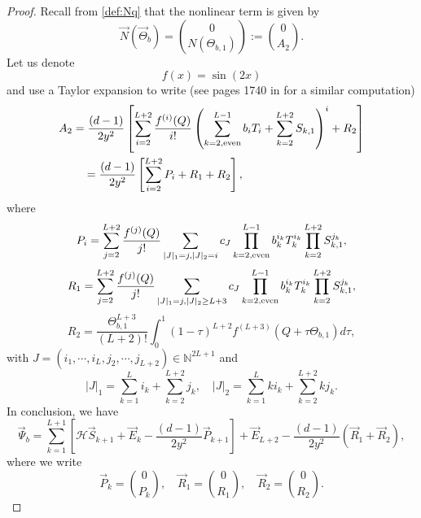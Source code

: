 \documentclass[11pt]{aims}
\theoremstyle{definition}
\numberwithin{equation}{section}
\begin{document}
\begin{proof}
Recall from \eqref{def:Nq} that the nonlinear term is given by
$$\vec N(\vec \Theta_b)= \binom{0}{N(\Theta_{b,1})}:= \binom{0}{A_2}.$$ 
Let us denote 
$$f(x) = \sin(2x)$$
and use a Taylor expansion to write (see pages 1740 in \cite{RSapde2014} for a similar computation)
\begin{align*}
A_2 &= \frac{(d-1)}{2y^2}\left[\sum_{i = 2}^{L+2}\frac{f^{(i)}(Q)}{i!}\left(\sum_{k = 2, \textup{even}}^{L-1}b_iT_i + \sum_{k = 2}^{L+2}S_{k,1} \right)^i + R_2\right]\\
&\quad = \frac{(d-1)}{2y^2}\left[\sum_{i = 2}^{L+2}P_i + R_1 + R_2\right],
\end{align*}
where 
\begin{equation}\label{def:Pj}
P_i = \sum_{j = 2}^{L+2}\frac{f^{(j)}(Q)}{j!}\sum_{|J|_1 = j, |J|_2 = i}c_J \prod_{k = 2, \textup{even}}^{L-1} b_k^{i_k}T_{k}^{i_k}\prod_{k=2}^{L+2}S_{k,1}^{j_k},
\end{equation}
\begin{equation}\label{def:R_1}
R_1 = \sum_{j = 2}^{L+2}\frac{f^{(j)}(Q)}{j!}\sum_{|J|_1 = j, |J|_2 \geq L+3}c_J \prod_{k = 2, \textup{even}}^{L-1}b_k^{i_k}T_{k}^{i_k}\prod_{k=2}^{L+2}S_{k,1}^{j_k},
\end{equation}
\begin{equation}\label{def:R2}
R_2 = \frac{\Theta_{b,1}^{L+3}}{(L+2)!}\int_0^1(1 - \tau)^{L+2}f^{(L+3)}(Q + \tau \Theta_{b,1})d\tau,
\end{equation}
with $J = (i_1, \cdots, i_L, j_2, \cdots, j_{L+2}) \in \mathbb{N}^{2L + 1}$ and 
\begin{equation}\label{def:J1J2}
|J|_1 = \sum_{k = 1}^L i_k + \sum_{k = 2}^{L+2}j_k, \quad |J|_2 = \sum_{k=1}^L ki_k + \sum_{k = 2}^{L+2}kj_k.
\end{equation}
In conclusion, we have 
\begin{equation}\label{eq:expanPsib}
\vec \Psi_b = \sum_{k = 1}^{L+1}\left[{\mathscr{H}} \vec S_{k + 1} + \vec E_k - \frac{(d-1)}{2y^2}\vec P_{k+1}\right] + \vec E_{L+2} - \frac{(d-1)}{2y^2}(\vec R_1 + \vec R_2),
\end{equation}
where we write 
$$\vec P_{k} = \binom{0}{P_k}, \quad \vec R_1 = \binom{0}{R_1}, \quad \vec R_2 = \binom{0}{R_2}.$$


\end{proof}
\end{document}
